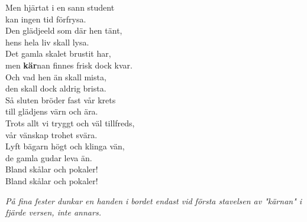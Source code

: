 \documentclass[a6paper, 10pt, twoside]{article}
\begin{document}
\begin{lyrics}
\newpage
\noindent
Men hjärtat i en sann student\\
kan ingen tid förfrysa.\\
Den glädjeeld som där hen tänt,\\
hens hela liv skall lysa.\\
Det gamla skalet brustit har,\\
men \textbf{kär}nan finnes frisk dock kvar.\\
Och vad hen än skall mista,\\
den skall dock aldrig brista.
\vspace{5pt}\\
Så sluten bröder fast vår krets\\
till glädjens värn och ära.\\
Trots allt vi tryggt och väl tillfreds,\\
vår vänskap trohet svära.\\
Lyft bägarn högt och klinga vän,\\
de gamla gudar leva än.\\
Bland skålar och pokaler!\\
Bland skålar och pokaler! 
\begin{center}
\textit{På fina fester dunkar en handen i bordet endast vid första stavelsen av "kärnan" i fjärde versen, inte annars.}
\end{center}
\end{lyrics}
\end{document}
